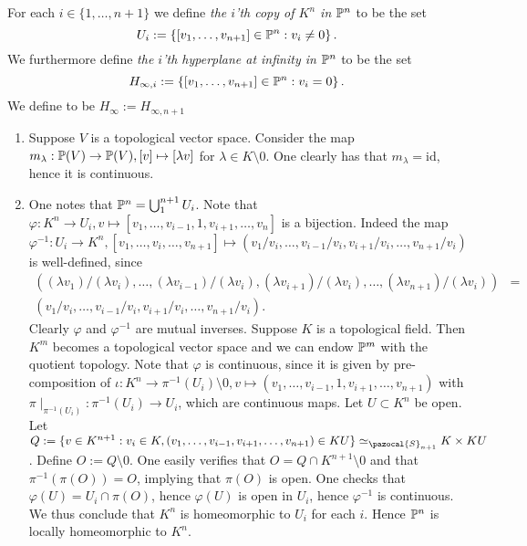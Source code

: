     \begin{definition}
        For each $i\in\{1,\dots,n+1\}$ we define \textit{the $i$'th copy of $K^n$ in $\mathbb{P}^n$} to be the set 
        $$U_i := \left\{[v_1,\dots,v_{n+1}]\in \mathbb{P}^n : v_i\neq 0 \right\}.$$
        We furthermore define \textit{the $i$'th hyperplane at infinity in $\mathbb{P}^n$} to be the set 
        $$H_{\infty,i}:=\left\{[v_1,\dots,v_{n+1}]\in \mathbb{P}^n: v_i=0\right\}.$$
        We define  to be $H_\infty := H_{\infty,{n+1}}$
    \end{definition}
    \begin{remark}
        \begin{enumerate}
            \item Suppose $V$ is a topological vector space. Consider the map $m_\lambda : \mathbb{P}(V)\rightarrow \mathbb{P}(V), [v]\mapsto [\lambda v]$ for $\lambda\in K\setminus0$. One clearly has that $m_\lambda =\mathrm{id}$, hence it is continuous.  
            \item One notes that $\mathbb{P}^n = \bigcup_1^{n+1} U_i$. Note that $\varphi : K^n \rightarrow U_i, v\mapsto [v_1,\dots,v_{i-1},1,v_{i+1},\dots,v_{n}]$ is a bijection. Indeed the map $$\varphi^{-1} : U_i\rightarrow K^n, [v_1,\dots,v_i,\dots,v_{n+1}]\mapsto (v_1/v_i,\dots,v_{i-1}/v_i,v_{i+1}/v_i,\dots,v_{n+1}/v_i)$$
            is well-defined, since 
            \begin{align*}((\lambda v_1)/(\lambda v_i),\dots,(\lambda v_{i-1})/(\lambda v_i),(\lambda v_{i+1})/(\lambda v_i),\dots,(\lambda v_{n+1})/(\lambda v_i)) &=\\ (v_1/v_i,\dots,v_{i-1}/v_i,v_{i+1}/v_i,\dots,v_{n+1}/v_i).\end{align*} 
            Clearly $\varphi$ and $\varphi^{-1}$ are mutual inverses. Suppose $K$ is a topological field. Then $K^m$ becomes a topological vector space and we can endow $\mathbb{P}^m$ with the quotient topology. Note that $\varphi$ is continuous, since it is given by pre-composition of $\iota: K^n\rightarrow \pi^{-1}(U_i)\setminus 0, v\mapsto (v_1,\dots,v_{i-1},1,v_{i+1},\dots,v_{n+1})$ with $\pi\mid_{\pi^{-1}(U_i)}: \pi^{-1}(U_i)\rightarrow U_i$, which are continuous maps. Let $U\subset K^n$ be open. Let $Q:=\{ v\in K^{n+1} : v_i\in K, (v_1,\dots,v_{i-1},v_{i+1},\dots,v_{n+1})\in KU\}\simeq_{\pazocal{S}_{n+1}} K\times KU$. Define $O:= Q\setminus 0$. One easily verifies that $O=Q\cap K^{n+1}\setminus 0$ and that $\pi^{-1}(\pi(O))=O$, implying that $\pi(O)$ is open. One checks that $\varphi(U)=U_i\cap \pi(O)$, hence $\varphi(U)$ is open in $U_i$, hence $\varphi^{-1}$ is continuous. We thus conclude that $K^{n}$ is homeomorphic to $U_i$ for each $i$. Hence $\mathbb{P}^n$ is locally homeomorphic to $K^n$. 

\end{enumerate}
\end{remark}
